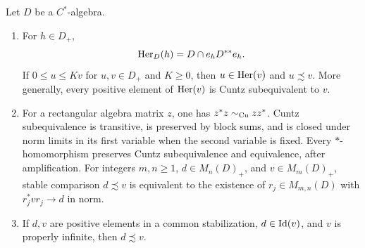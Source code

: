 \begin{lemma}\label{lem:comparison-rules}
Let \(D\) be a \(C^*\)-algebra.
\begin{enumerate}[label=\textup{(\roman*)}]
\item For \(h\in D_+\),
\[
 \operatorname{Her}_D(h)=D\cap e_hD^{**}e_h.
\]
If \(0\le u\le K v\) for \(u,v\in D_+\) and \(K\ge0\), then
\(u\in\operatorname{Her}(v)\) and \(u\precsim v\).  More generally, every
positive element of \(\operatorname{Her}(v)\) is Cuntz subequivalent to \(v\).
\item For a rectangular algebra matrix \(z\), one has
\(z^*z\sim_{\mathrm{Cu}} zz^*\).  Cuntz subequivalence is transitive, is
preserved by block sums, and is closed under norm limits in its
first variable when the second variable is fixed.  Every
\(*\)-homomorphism preserves Cuntz subequivalence and equivalence,
after amplification.  For integers \(m,n\ge1\), \(d\in M_n(D)_+\),
and \(v\in M_m(D)_+\), stable comparison \(d\precsim v\) is
equivalent to the existence of \(r_j\in M_{m,n}(D)\) with
\(r_j^*vr_j\to d\) in norm.
\item If \(d,v\) are positive elements in a common stabilization,
\(d\in\operatorname{Id}(v)\), and \(v\) is properly infinite, then
\(d\precsim v\).
\end{enumerate}
\end{lemma}


